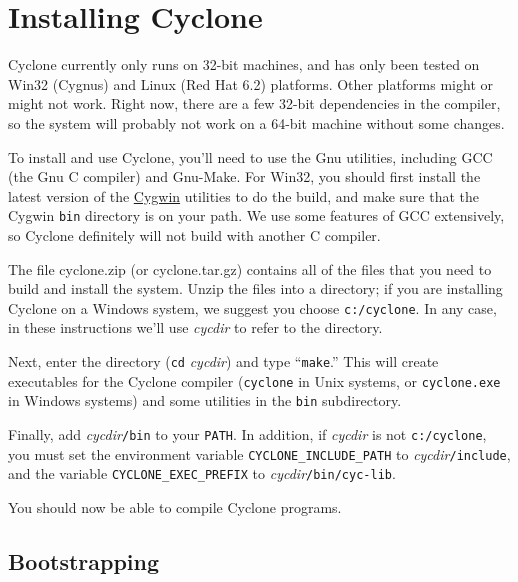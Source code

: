 \section{Installing Cyclone}
\label{sec:install}
Cyclone currently only runs on 32-bit machines, and has only been
tested on Win32 (Cygnus) and Linux (Red Hat 6.2) platforms.  Other
platforms might or might not work.  Right now, there are a few 32-bit
dependencies in the compiler, so the system will probably not work on
a 64-bit machine without some changes.

To install and use Cyclone, you'll need to use the Gnu utilities,
including GCC (the Gnu C compiler) and Gnu-Make.  For Win32, you
should first install the latest version of the
\href{http://cygwin.com/}{Cygwin} utilities to do the build, and make
sure that the Cygwin \texttt{bin} directory is on your path. We use
some features of GCC extensively, so Cyclone definitely will not build
with another C compiler.

The file cyclone.zip (or cyclone.tar.gz) contains all of the files
that you need to build and install the system.  Unzip the files into a
directory; if you are installing Cyclone on a Windows system, we
suggest you choose \texttt{c:/cyclone}.  In any case, in these
instructions we'll use \textit{cycdir} to refer to the directory.

Next, enter the directory (\texttt{cd} \textit{cycdir}) and type
``\texttt{make}.''  This will create executables for the Cyclone
compiler (\texttt{cyclone} in Unix systems, or \texttt{cyclone.exe} in
Windows systems) and some utilities in the \texttt{bin} subdirectory.

Finally, add \textit{cycdir}\texttt{/bin} to your \texttt{PATH}.  In
addition, if \textit{cycdir} is not \texttt{c:/cyclone}, you must set
the environment variable \texttt{CYCLONE_INCLUDE_PATH} to
\textit{cycdir}\texttt{/include}, and the variable
\texttt{CYCLONE_EXEC_PREFIX} to \textit{cycdir}\texttt{/bin/cyc-lib}.

You should now be able to compile Cyclone programs.

\subsection*{Bootstrapping}

